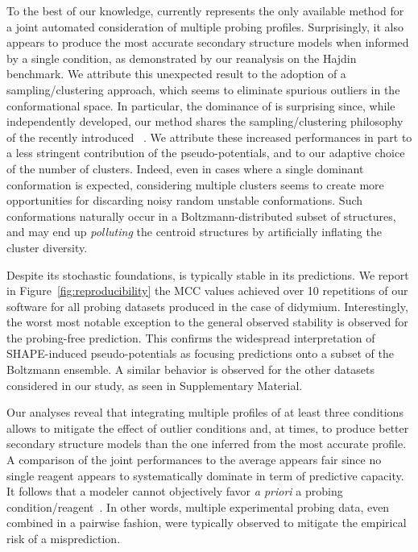 \documentclass[a4,center,fleqn]{NAR}
\begin{document}
To the best of our knowledge, \OurTool currently represents the only available method for a joint automated consideration of multiple probing profiles. Surprisingly, it also appears to produce the most accurate secondary structure models when informed by a single condition, as demonstrated by our reanalysis on the Hajdin\etal\cite{Hajdin2013} benchmark. We attribute this unexpected result to the adoption of a sampling/clustering approach, which seems to eliminate spurious outliers in the conformational space. In particular, the dominance of \OurTool is surprising since, while independently developed, our method shares the sampling/clustering philosophy of the recently introduced ~\cite{Spasic2017}. We attribute these increased performances in part to a less stringent contribution of the pseudo-potentials, and to our adaptive choice of the number of clusters. Indeed, even in cases where a single dominant conformation is expected, considering multiple clusters seems to create more opportunities for discarding noisy random unstable conformations. Such conformations naturally occur in a Boltzmann-distributed subset of structures, and may end up \emph{polluting} the centroid structures by artificially inflating the cluster diversity. 

Despite its stochastic foundations, \OurTool{} is typically stable in its predictions. We report in Figure~\ref{fig:reproducibility} the MCC values achieved over  10 repetitions of our software for all probing datasets produced in the case of didymium. 
Interestingly, the worst most notable exception to the general observed stability is observed for the probing-free prediction. This confirms the widespread interpretation of SHAPE-induced pseudo-potentials as focusing predictions onto a subset of the Boltzmann ensemble. A similar behavior is observed for the other datasets considered in our study, as seen in Supplementary Material. %



Our analyses reveal that integrating multiple profiles of at least three conditions allows to mitigate the effect of outlier conditions and, at times, to produce better secondary structure models than the one inferred from the most accurate profile. A comparison of the joint performances to the average appears fair since no single reagent appears to systematically dominate in term of predictive capacity. It follows that a modeler cannot objectively favor \emph{a priori} a probing condition/reagent~\cite{Yu2018}. In other words, multiple experimental probing data, even combined in a pairwise fashion, were typically observed to mitigate the empirical risk of a misprediction. 
\end{document}
